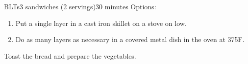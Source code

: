 \documentclass[../Cookbook.tex]{subfiles}
\begin{document}
\begin{recipe}{BLTs}{3 sandwiches (2 servings)}{30 minutes}
  Options:
  \begin{enumerate}
    \item Put a single layer in a cast iron skillet on a stove on low.
    \item Do as many layers as necessary in a covered metal dish in the oven at 375\0F.
  \end{enumerate}

  Toast the bread and prepare the vegetables.
\end{recipe}
\end{document}
